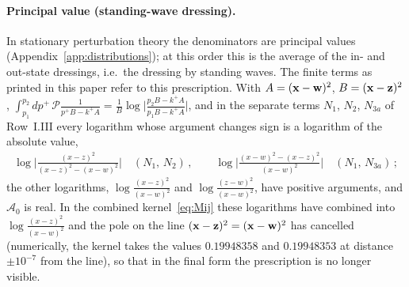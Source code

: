 \paragraph{Principal value (standing-wave dressing).} In stationary perturbation theory the denominators are principal values (Appendix~\ref{app:distributions}); at this order this is the average of the in- and out-state dressings, i.e.\ the dressing by standing waves. The finite terms as printed in this paper refer to this prescription. With $A=(\mathbf{x}-\mathbf{w})^2$, $B=(\mathbf{x}-\mathbf{z})^2$, $\int_{p_1}^{p_2}dp^+\,\mathcal P\frac{1}{p^+B-k^+A}=\frac1B\log\big|\frac{p_2B-k^+A}{p_1B-k^+A}\big|$, and in the separate terms $N_1$, $N_2$, $N_{3a}$ of Row~I.III every logarithm whose argument changes sign is a logarithm of the absolute value,
\begin{align}
\log\Big|\frac{(x-z)^2}{(x-z)^2-(x-w)^2}\Big|\quad(N_1,\,N_2)\,,\qquad\log\Big|\frac{(x-w)^2-(x-z)^2}{(x-w)^2}\Big|\quad(N_1,\,N_{3a})\,;
\end{align}
the other logarithms, $\log\frac{(x-z)^2}{(x-w)^2}$ and $\log\frac{(z-w)^2}{(x-w)^2}$, have positive arguments, and $\mathcal A_0$ is real. In the combined kernel~\eqref{eq:Mij} these logarithms have combined into $\log\frac{(x-z)^2}{(x-w)^2}$ and the pole on the line $(\mathbf{x}-\mathbf{z})^2=(\mathbf{x}-\mathbf{w})^2$ has cancelled (numerically, the kernel takes the values $0.19948358$ and $0.19948353$ at distance $\pm10^{-7}$ from the line), so that in the final form the prescription is no longer visible.

